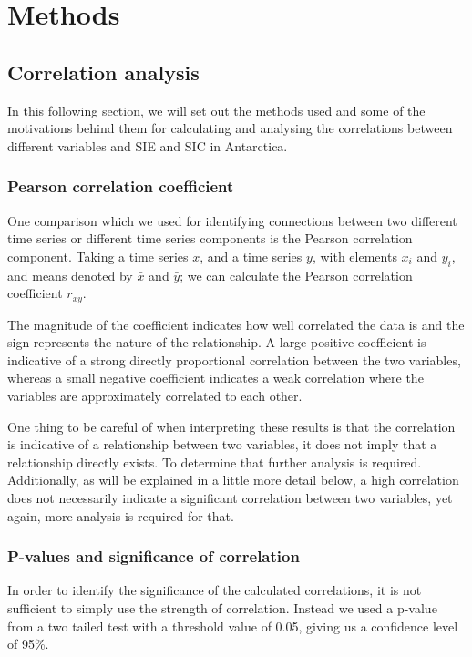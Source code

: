 \documentclass[../main.tex]{subfiles}
\begin{document}
\chapter{Methods}
\label{chap:methods}

\section{Correlation analysis}
\label{Methods:pearson}

In this following section, we will set out the methods used and some of the motivations behind them for calculating and analysing the correlations between different variables and SIE and SIC in Antarctica.

\subsection{Pearson correlation coefficient}
One comparison which we used for identifying connections between two different time series or different time series components is the Pearson correlation component. Taking a time series $x$, and a time series $y$, with elements $x_i$ and $y_i$, and means denoted by $\bar{x}$ and $\bar{y}$; we can calculate the Pearson correlation coefficient $r_{xy}$.



The magnitude of the coefficient indicates how well correlated the data is and the sign represents the nature of the relationship. A large positive coefficient is indicative of a strong directly proportional correlation between the two variables, whereas a small negative coefficient indicates a weak correlation where the variables are approximately correlated to each other.

One thing to be careful of when interpreting these results is that the correlation is indicative of a relationship between two variables, it does not imply that a relationship directly exists. To determine that further analysis is required. Additionally, as will be explained in a little more detail below, a high correlation does not necessarily indicate a significant correlation between two variables, yet again, more analysis is required for that.

\subsection{P-values and significance of correlation}
In order to identify the significance of the calculated correlations, it is not sufficient to simply use the strength of correlation. Instead we used a p-value from a two tailed test with a threshold value of 0.05, giving us a confidence level of 95\%.
\end{document}
